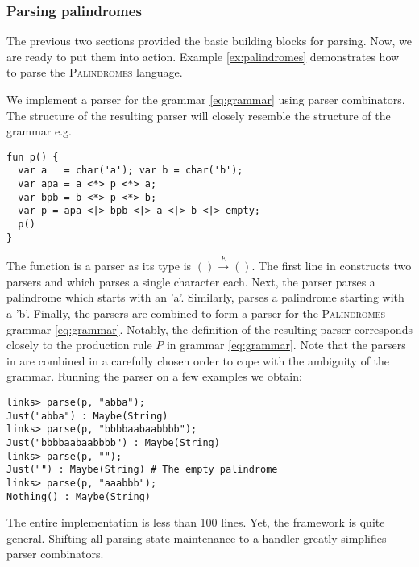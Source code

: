 \subsubsection{Parsing palindromes}
The previous two sections provided the basic building blocks for parsing. Now, we are ready to put them into action. Example \ref{ex:palindromes} demonstrates how to parse the {\scshape{Palindromes}} language.
\begin{example}\label{ex:palindromes}
We implement a parser for the grammar \eqref{eq:grammar} using parser combinators. The structure of the resulting parser will closely resemble the structure of the grammar e.g.
\begin{lstlisting}[style=links]
fun p() {
  var a   = char('a'); var b = char('b');
  var apa = a <*> p <*> a;
  var bpb = b <*> p <*> b;
  var p = apa <|> bpb <|> a <|> b <|> empty;
  p()
}
\end{lstlisting}
The function  is a parser as its type is $() \xrightarrow{E} ()$. The first line in  constructs two parsers  and  which parses a single character each. Next, the parser  parses a palindrome which starts with an 'a'. Similarly,  parses a palindrome starting with a 'b'.
Finally, the parsers are combined to form a parser for the {\scshape{Palindromes}} grammar \eqref{eq:grammar}.
Notably, the definition of the resulting parser  corresponds closely to the production rule $P$ in grammar \eqref{eq:grammar}. Note that the parsers in  are combined in a carefully chosen order to cope with the ambiguity of the grammar.
Running the parser on a few examples we obtain:
\begin{lstlisting}[style=links]
links> parse(p, "abba");
Just("abba") : Maybe(String)
links> parse(p, "bbbbaabaabbbb");
Just("bbbbaabaabbbb") : Maybe(String)
links> parse(p, "");
Just("") : Maybe(String) # The empty palindrome
links> parse(p, "aaabbb");
Nothing() : Maybe(String)
\end{lstlisting}
\end{example}

The entire implementation is less than 100 lines. Yet, the framework is quite general. Shifting all parsing state maintenance to a handler greatly simplifies parser combinators. 